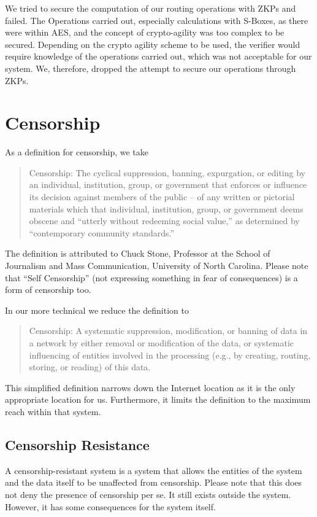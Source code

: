 We tried to secure the computation of our routing operations with ZKPs and failed. The Operations carried out, especially calculations with S-Boxes, as there were within AES, and the concept of crypto-agility was too complex to be secured. Depending on the crypto agility scheme to be used, the verifier would require knowledge of the operations carried out, which was not acceptable for our system. We, therefore, dropped the attempt to secure our operations through ZKPs.

\section{Censorship}
As a definition for censorship, we take
\begin{quote}
	Censorship: The cyclical suppression, banning, expurgation, or editing by an individual, institution, group, or government that enforces or influence its decision against members of the public -- of any written or pictorial materials which that individual, institution, group, or government deems obscene and ``utterly without redeeming social value,'' as determined by ``contemporary community standards.''
\end{quote}

The definition is attributed to Chuck Stone, Professor at the School of Journalism and Mass Communication, University of North Carolina. Please note that ``Self Censorship'' (not expressing something in fear of consequences) is a form of censorship too.

In our more technical we reduce the definition to
\begin{quote}
	Censorship: A systematic suppression, modification, or banning of data in a network by either removal or modification of the data, or systematic influencing of entities involved in the processing (e.g., by creating, routing, storing, or reading) of this data.
\end{quote}
This simplified definition narrows down the Internet location as it is the only appropriate location for us.  Furthermore, it limits the definition to the maximum reach within that system.

\subsection{Censorship Resistance}
A censorship-resistant system is a system that allows the entities of the system and the data itself to be unaffected from censorship. Please note that this does not deny the presence of censorship per se. It still exists outside the system. However, it has some consequences for the system itself.

